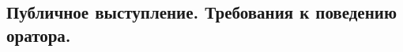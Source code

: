 \documentclass[a4paper,12pt]{article}
\begin{document}
\begin{large}

\setlength{\parindent}{20pt} %
\section{Публичное выступление. Требования к поведению оратора.}
\end{large}
\end{document}
